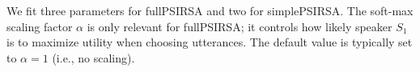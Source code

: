 \documentclass[10pt,a4paper]{article}
\begin{document}
We fit three parameters for fullPSIRSA and two for simplePSIRSA.
The soft-max scaling factor $\alpha$ is only relevant for fullPSIRSA; it  controls how likely speaker $S_1$ is to maximize utility when choosing utterances. 
The default value is typically set to $\alpha=1$ (i.e., no scaling). 
\end{document}

